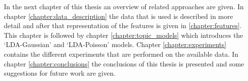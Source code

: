 In the next chapter of this thesis an overview of related approaches are given. In chapter \ref{chapter:data_description} the data that is used is described in more detail and after that representation of the features is given in \ref{chapter:features}. This chapter is followed by chapter \ref{chapter:topic_models} which introduces the `LDA-Gaussian' and `LDA-Poisson' models. Chapter \ref{chapter:experiments} contains the different experiments that are performed on the available data. In chapter \ref{chapter:conclusions} the conclusions of this thesis is presented and some suggestions for future work are given.


